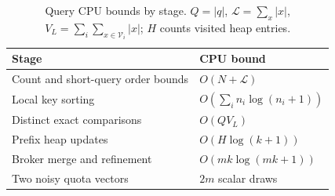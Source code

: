 \begin{table}[t]
\centering
\caption{Query CPU bounds by stage. $Q=|q|$, $\mathcal L=\sum_x|x|$, $V_L=\sum_i\sum_{x\in\mathcal V_i}|x|$; $H$ counts visited heap entries.}
\label{tab:complexity}
\small
\begin{tabular}{@{}ll@{}}
\toprule
Stage & CPU bound \\
\midrule
Count and short-query order bounds & $O(N+\mathcal L)$ \\
Local key sorting & $O(\sum_i n_i\log(n_i+1))$ \\
Distinct exact comparisons & $O(QV_L)$ \\
Prefix heap updates & $O(H\log(k+1))$ \\
Broker merge and refinement & $O(mk\log(mk+1))$ \\
Two noisy quota vectors & $2m$ scalar draws \\
\bottomrule
\end{tabular}
\end{table}
